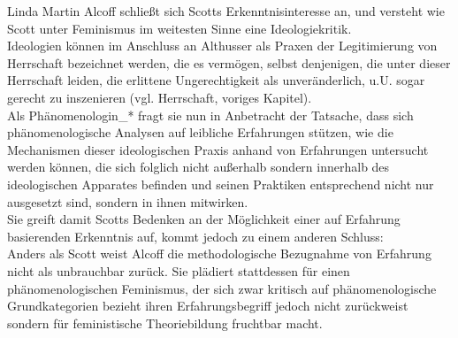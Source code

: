 Linda Martin Alcoff schließt sich Scotts Erkenntnisinteresse an, und versteht
wie Scott unter Feminismus im weitesten Sinne eine Ideologiekritik.\\
Ideologien
können im Anschluss an Althusser als Praxen der Legitimierung von Herrschaft
bezeichnet werden, die es vermögen, selbst denjenigen, die unter dieser
Herrschaft leiden, die erlittene Ungerechtigkeit als unveränderlich, u.U. sogar
gerecht zu inszenieren (vgl. Herrschaft, voriges Kapitel). \\
Als Phänomenologin\_* fragt sie
nun in Anbetracht der Tatsache, dass sich phänomenologische Analysen auf
leibliche Erfahrungen stützen, wie die Mechanismen dieser ideologischen Praxis
anhand von Erfahrungen untersucht werden können, die sich folglich nicht
außerhalb sondern innerhalb des ideologischen Apparates befinden und seinen
Praktiken entsprechend nicht nur ausgesetzt sind, sondern in ihnen mitwirken.\\

\noindent Sie greift damit Scotts Bedenken an der Möglichkeit einer auf Erfahrung
basierenden Erkenntnis auf, kommt jedoch zu einem anderen Schluss:\\
Anders als
Scott weist Alcoff die methodologische Bezugnahme von Erfahrung nicht als
unbrauchbar zurück. Sie plädiert stattdessen für einen phänomenologischen
Feminismus, der sich zwar kritisch auf phänomenologische Grundkategorien
bezieht ihren Erfahrungsbegriff jedoch nicht zurückweist sondern für
feministische Theoriebildung fruchtbar macht.\\

